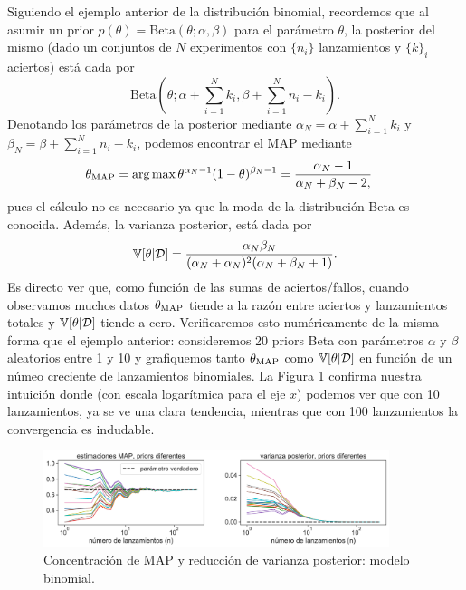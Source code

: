 \begin{mdframed}[style=ejemplo, frametitle={\center Ejemplo: MAP para el modelo binomial}]

Siguiendo el ejemplo anterior de la distribución binomial, recordemos que al asumir un prior $p(\theta) = \text{Beta}\left(\theta; \alpha,\beta \right)$ para el parámetro $\theta$, la posterior del mismo (dado un conjuntos de $N$ experimentos con $\{n_i\}$ lanzamientos  y $\{k\}_i$ aciertos) está dada por 
\begin{equation}
  	\text{Beta}\left(\theta; \alpha + \sum_{i=1}^N k_i, \beta + \sum_{i=1}^N n_i - k_i \right).
  \end{equation}
  Denotando los parámetros de la posterior mediante $\alpha_N = \alpha + \sum_{i=1}^N k_i$ y $\beta_N = \beta + \sum_{i=1}^N n_i-k_i$, podemos encontrar el MAP mediante
  \begin{align}
  	\theta_\text{MAP} &= \operatorname*{arg\,max} \theta^{\alpha_N - 1}(1-\theta)^{\beta_N -1} = \frac{\alpha_N - 1}{\alpha_N + \beta_N - 2,
  	}\nonumber
  \end{align}
  pues el cálculo no es necesario ya que la moda de la distribución Beta es conocida. Además, la varianza posterior, está dada por 
  \begin{equation}
  	\operatorname{\mathbb{V}}[\theta|{\mathcal D}] = \frac{\alpha_N \beta_N }{(\alpha_N  + \alpha_N )^2(\alpha_N  + \beta_N +1)}.
  \end{equation}
  Es directo ver que, como función de las sumas de aciertos/fallos, cuando  observamos muchos datos $\theta_\text{MAP}$ tiende a la razón entre aciertos y lanzamientos  totales y $\operatorname{\mathbb{V}}[\theta|{\mathcal D}] $ tiende a cero. Verificaremos esto numéricamente de la misma forma que el ejemplo anterior: consideremos 20 priors Beta con parámetros $\alpha$ y $\beta$ aleatorios entre 1 y 10 y grafiquemos tanto $\theta_\text{MAP}$ como $\operatorname{\mathbb{V}}[\theta|{\mathcal D}] $ en función de un númeo creciente de lanzamientos binomiales. La Figura \ref{fig:binomial_MAP} confirma nuestra intuición donde (con escala logarítmica para el eje $x$) podemos ver que con 10 lanzamientos, ya se ve una clara tendencia, mientras que con 100 lanzamientos la convergencia es indudable. 

\begin{figure}[H]
	\centering
	\includegraphics[width=0.9\textwidth]{img/cap1_bayesian_binomial_MAP.pdf}
	\caption{Concentración de MAP y reducción de varianza posterior: modelo binomial.}
	\label{fig:binomial_MAP}
\end{figure}


\end{mdframed}






